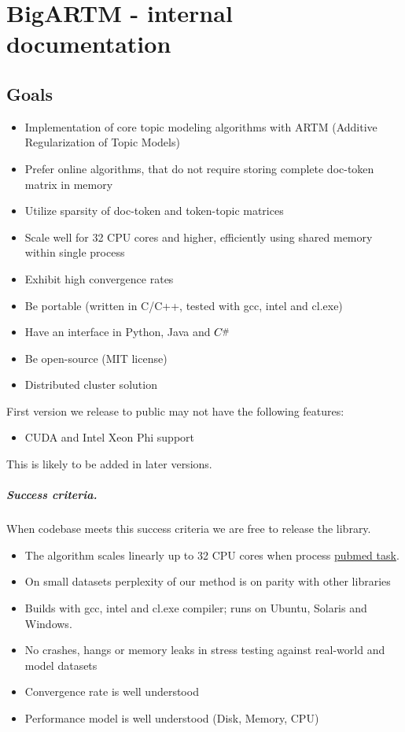 \documentclass[11pt,a4paper,twoside]{report}
\newcommand{\Csharp}{%
  {\settoheight{\dimen0}{C}C\kern-.05em \resizebox{!}{\dimen0}{\raisebox{\depth}{\#}}}}
\begin{document}
\tableofcontents

\chapter{BigARTM - internal documentation}

\section{Goals}

\begin{itemize}
    \item Implementation of core topic modeling algorithms with ARTM (Additive Regularization of Topic Models)
    \item Prefer online algorithms, that do not require storing complete doc-token matrix in memory
    \item Utilize sparsity of doc-token and token-topic matrices
    \item Scale well for 32 CPU cores and higher, efficiently using shared memory within single process
    \item Exhibit high convergence rates
    \item Be portable (written in C/C++, tested with gcc, intel and cl.exe)
    \item Have an interface in Python, Java and $\Csharp$
    \item Be open-source (MIT license)
    \item Distributed cluster solution
\end{itemize}
First version we release to public may not have the following features:
\begin{itemize}
    \item CUDA and Intel Xeon Phi support
\end{itemize}
This is likely to be added in later versions.

\paragraph{Success criteria.}
When codebase meets this success criteria we are free to release the library.
\begin{itemize}
    \item The algorithm scales linearly up to 32 CPU cores when process
    \href{http://archive.ics.uci.edu/ml/datasets/Bag+of+Words}{pubmed task}.
    \item On small datasets perplexity of our method is on parity with other libraries
    \item Builds with gcc, intel and cl.exe compiler; runs on Ubuntu, Solaris and Windows.
    \item No crashes, hangs or memory leaks in stress testing against real-world and model datasets
    \item Convergence rate is well understood
    \item Performance model is well understood (Disk, Memory, CPU)
\end{itemize}
\end{document}

